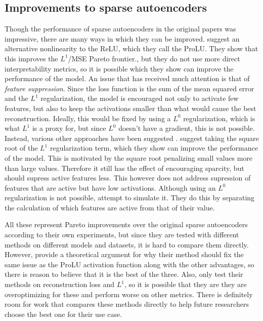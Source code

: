 \documentclass[../../main.tex]{subfiles}
\begin{document}
\subsection{Improvements to sparse autoencoders}\label{sec:improvements_to_saes}
Though the performance of sparse autoencoders in the original papers \citep{bricken_towards_2023}\citep{cunningham_sparse_2023} was impressive, there are many ways in which they can be improved.
\citet{taggart_prolu_2024} suggest an alternative nonlinearity to the ReLU, which they call the ProLU.
They show that this improves the $L^1$/MSE Pareto frontier., but they do not use more direct interpretability metrics, so it is possible  which they show can improve the performance of the model.
An issue that has received much attention is that of \emph{feature suppression}.
Since the loss function is the sum of the mean squared error and the $L^1$ regularization, the model is encouraged not only to activate few features, but also to keep the activations smaller than what would cause the best reconstruction.
Ideally, this would be fixed by using a $L^0$ regularization, which is what $L^1$ is a proxy for, but since $L^0$ doesn't have a gradient, this is not possible.
Instead, various other approaches have been suggested \citep{wright_addressing_2024}.
\citet{riggs_improving_2024} suggest taking the square root of the $L^1$ regularization term, which they show can improve the performance of the model.
This is motivated by the square root penalizing small values more than large values.
Therefore it still has the effect of encouraging sparcity, but should supress active features less.
This however does not address supression of features that are active but have low activations.
Although using an $L^0$ regularization is not possible, \citet{rajamanoharan_improving_2024} attempt to simulate it.
They do this by separating the calculation of which features are active from that of their value.

All these represent Pareto improvements over the original sparse autoencoders according to their own experiments, but since they are tested with different methods on different models and datasets, it is hard to compare them directly.
However, \citet{rajamanoharan_improving_2024} provide a theoretical argument for why their method should fix the same issue as the ProLU activation function along with the other advantages, so there is reason to believe that it is the best of the three.
Also, \citet{riggs_improving_2024} only test their methods on reconstruction loss and $L^1$, so it is possible that they are they are overoptimizing for these and perform worse on other metrics.
There is definitely room for work that compares these methods directly to help future researchers choose the best one for their use case.
\end{document}
